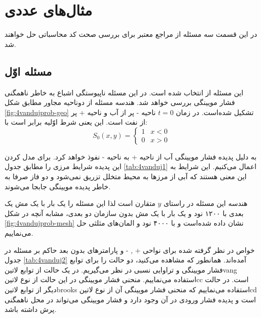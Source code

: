 \chapter{مثال‌های عددی}
\label{ch:fasl4}
در این قسمت سه مسئله از مراجع معتبر برای بررسی صحت کد محاسباتی حل خواهند شد.


\section{مسئله اوّل}
این مسئله از \cite{vandujthes,vandujanal} انتخاب شده است. در این مسئله ناپیوستگی اشباع به خاطر ناهمگنی فشار مویینگی بررسی خواهد شد. هندسه مسئله از دوناحیه مجاور مطابق شکل \ref{fig:4vandujprob-geo} تشکیل شده‌است. در زمان $t=0$ ناحیه - پر از آب و ناحیه + پر از نفت است. این یعنی شرط اوّلیه برابر است با:
\begin{equation}
\label{eq:4ini}
S_0(x,y)=\begin{cases}
1 &x<0 \\
0 &x>0
\end{cases}
\end{equation}

به دلیل پدیده فشار مویینگی آب از ناحیه + به ناحیه - نفوذ خواهد کرد. برای مدل کردن این پدیده شرایط مرزی را مطابق جدول \ref{tab:4vanduj1} اعمال می‌کنیم. این شرایط به این معنی هستند که آبی از مرز‌‌ها به محیط متخلل تزریق نمی‌شود و دو فاز صرفا به خاطر پدیده مویینگی جابجا می‌شوند.

هندسه این مسئله در راستای $y$ متقارن است لذا این مسئله را یک بار با یک مش یک بعدی با ۱۲۰۰ نود و یک بار با یک مش بدون سازمان دو بعدی، مشابه آنچه در شکل \ref{fig:4vandujprob-mesh} نشان داده شده‌است و با ۴۰۰۰ نود و المان‌های مثلثی حل ‌می‌نماییم. 

خواص در نظر گرفته شده برای نواحی + , - و پارامتر‌های بدون بعد حاکم بر مسئله در جدول \ref{tab:4vanduj2} آمده‌اند. همانطور که مشاهده می‌کنید، دو حالت را برای توابع فشار مویینگی و تراوایی نسبی در نظر می‌گیریم. در یک حالت از توابع \text‌لاتین{vang} استفاده می‌نماییم. منحنی فشار مویینگی در این حالت از نوع \text‌لاتین{cc} است. در حالت دیگر از توابع \text‌لاتین{brooks} استفاده می‌نماییم که منحنی فشار مویینگی آن از نوع \text‌لاتین{cd} است و پدیده فشار ورودی در آن وجود دارد و فشار مویینگی می‌تواند در محل ناهمگنی پرش داشته باشد.

